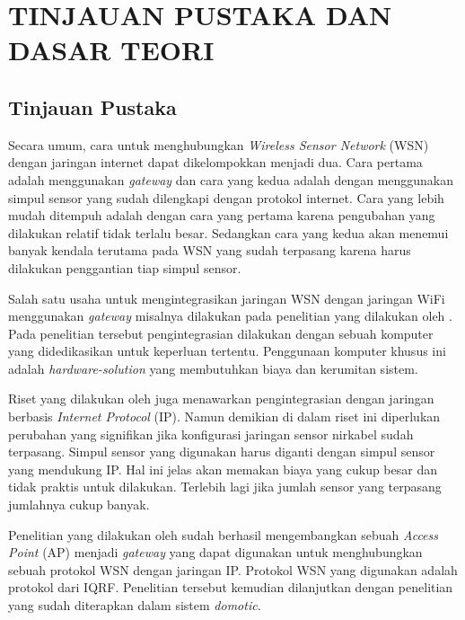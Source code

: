 
\chapter{TINJAUAN PUSTAKA DAN DASAR TEORI}                

\section{Tinjauan Pustaka}
  Secara umum, cara untuk menghubungkan \emph{Wireless Sensor Network} (WSN) dengan jaringan internet dapat dikelompokkan menjadi dua. Cara pertama adalah menggunakan \emph{gateway} dan cara yang kedua adalah dengan menggunakan simpul sensor yang sudah dilengkapi dengan protokol internet. Cara yang lebih mudah ditempuh adalah dengan cara yang pertama karena pengubahan yang dilakukan relatif tidak terlalu besar. Sedangkan cara yang kedua akan menemui banyak kendala terutama pada WSN yang sudah terpasang karena harus dilakukan penggantian tiap simpul sensor.

  Salah satu usaha untuk mengintegrasikan jaringan WSN dengan jaringan WiFi menggunakan \emph{gateway} misalnya dilakukan pada penelitian yang dilakukan oleh \cite{Spinar2009}. Pada penelitian tersebut pengintegrasian dilakukan dengan sebuah komputer yang didedikasikan untuk keperluan tertentu. Penggunaan komputer khusus ini adalah \emph{hardware-solution} yang membutuhkan biaya dan kerumitan sistem.

  Riset yang dilakukan oleh \cite{Dunkels2004} juga menawarkan pengintegrasian dengan jaringan berbasis \emph{Internet Protocol} (IP). Namun demikian di dalam riset ini diperlukan perubahan yang signifikan jika konfigurasi jaringan sensor nirkabel sudah terpasang. Simpul sensor yang digunakan harus diganti dengan simpul sensor yang mendukung IP. Hal ini jelas akan memakan biaya yang cukup besar dan tidak praktis untuk dilakukan. Terlebih lagi jika jumlah sensor yang terpasang jumlahnya cukup banyak.

  Penelitian yang dilakukan oleh \cite{wibowo2013wireless} sudah berhasil mengembangkan sebuah \emph{Access Point} (AP) menjadi \emph{gateway} yang dapat digunakan untuk menghubungkan sebuah protokol WSN dengan jaringan IP. Protokol WSN yang digunakan adalah protokol dari IQRF. Penelitian tersebut kemudian dilanjutkan dengan penelitian yang sudah diterapkan dalam sistem \emph{domotic}.

